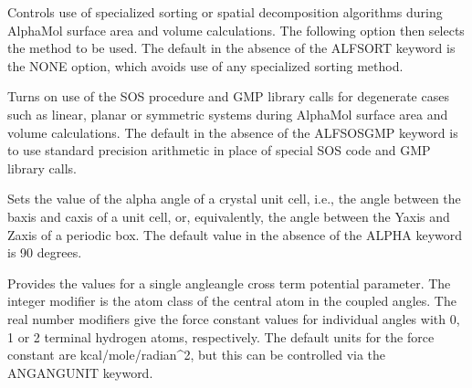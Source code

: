 \documentclass[letterpaper,11pt,english]{sphinxmanual}
\begin{document}
\ignorespaces {}\label{\detokenize{text/keywords:key-alf-sort}}\begin{description}
\sphinxAtStartPar
Controls use of specialized sorting or spatial decomposition algorithms during AlphaMol surface area and volume calculations. The following option then selects the method to be used. The default in the absence of the ALF\sphinxhyphen{}SORT keyword is the NONE option, which avoids use of any specialized sorting method.

\end{description}

\ignorespaces {}\label{\detokenize{text/keywords:key-alf-sosgmp}}\begin{description}
\sphinxAtStartPar
Turns on use of the SOS procedure and GMP library calls for degenerate cases such as linear, planar or symmetric systems during AlphaMol surface area and volume calculations. The default in the absence of the ALF\sphinxhyphen{}SOSGMP keyword is to use standard precision arithmetic in place of special SOS code and GMP library calls.

\end{description}

\ignorespaces {}\label{\detokenize{text/keywords:key-alpha}}\begin{description}
\sphinxAtStartPar
Sets the value of the alpha angle of a crystal unit cell, i.e., the angle between the b\sphinxhyphen{}axis and c\sphinxhyphen{}axis of a unit cell, or, equivalently, the angle between the Y\sphinxhyphen{}axis and Z\sphinxhyphen{}axis of a periodic box. The default value in the absence of the ALPHA keyword is 90 degrees.

\end{description}

\ignorespaces {}\label{\detokenize{text/keywords:key-angang}}\begin{description}
\sphinxAtStartPar
Provides the values for a single angle\sphinxhyphen{}angle cross term potential parameter. The integer modifier is the atom class of the central atom in the coupled angles. The real number modifiers give the force constant values for individual angles with 0, 1 or 2 terminal hydrogen atoms, respectively. The default units for the force constant are kcal/mole/radian\textasciicircum{}2, but this can be controlled via the ANGANGUNIT keyword.

\end{description}
\end{document}
